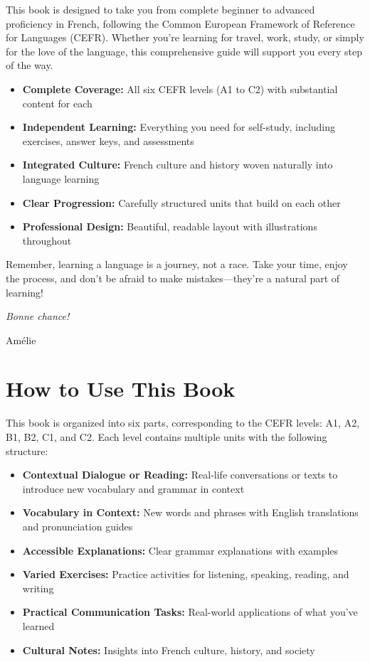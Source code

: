 This book is designed to take you from complete beginner to advanced proficiency in French, following the Common European Framework of Reference for Languages (CEFR). Whether you're learning for travel, work, study, or simply for the love of the language, this comprehensive guide will support you every step of the way.

\begin{itemize}
\item \textbf{Complete Coverage:} All six CEFR levels (A1 to C2) with substantial content for each
\item \textbf{Independent Learning:} Everything you need for self-study, including exercises, answer keys, and assessments
\item \textbf{Integrated Culture:} French culture and history woven naturally into language learning
\item \textbf{Clear Progression:} Carefully structured units that build on each other
\item \textbf{Professional Design:} Beautiful, readable layout with illustrations throughout
\end{itemize}

Remember, learning a language is a journey, not a race. Take your time, enjoy the process, and don't be afraid to make mistakes—they're a natural part of learning!

\begin{flushright}
\textit{Bonne chance!} \par
Amélie
\end{flushright}

\clearpage

\chapter*{How to Use This Book}

This book is organized into six parts, corresponding to the CEFR levels: A1, A2, B1, B2, C1, and C2. Each level contains multiple units with the following structure:

\begin{itemize}
\item \textbf{Contextual Dialogue or Reading:} Real-life conversations or texts to introduce new vocabulary and grammar in context
\item \textbf{Vocabulary in Context:} New words and phrases with English translations and pronunciation guides
\item \textbf{Accessible Explanations:} Clear grammar explanations with examples
\item \textbf{Varied Exercises:} Practice activities for listening, speaking, reading, and writing
\item \textbf{Practical Communication Tasks:} Real-world applications of what you've learned
\item \textbf{Cultural Notes:} Insights into French culture, history, and society
\end{itemize}


